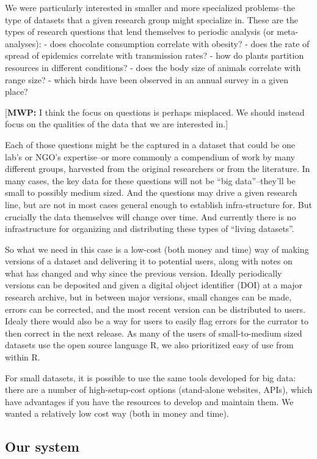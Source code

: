 \documentclass[a4paper,11pt]{article}
\begin{document}
We were particularly interested in smaller and more specialized
problems--the type of datasets that a given research group might
specialize in. These are the types of research questions that lend
themselves to periodic analysis (or meta-analyses): - does chocolate
consumption correlate with obesity? - does the rate of spread of
epidemics correlate with transmission rates? - how do plants partition
resources in different conditions? - does the body size of animals
correlate with range size? - which birds have been observed in an annual
survey in a given place?

{[}\textbf{MWP:} I think the focus on questions is perhaps misplaced. We
should instead focus on the qualities of the data that we are interested
in.{]}

Each of those questions might be the captured in a dataset that could be
one lab's or NGO's expertise--or more commonly a compendium of work by
many different groups, harvested from the original researchers or from
the literature. In many cases, the key data for these questions will not
be ``big data''--they'll be small to possibly medium sized. And the
questions may drive a given research line, but are not in most cases
general enough to establish infra-structure for. But crucially the data
themselves will change over time. And currently there is no
infrastructure for organizing and distributing these types of ``living
datasets''.

So what we need in this case is a low-cost (both money and time) way of
making versions of a dataset and delivering it to potential users, along
with notes on what has changed and why since the previous version.
Ideally periodically versions can be deposited and given a digital
object identifier (DOI) at a major research archive, but in between
major versions, small changes can be made, errors can be corrected, and
the most recent version can be distributed to users. Idealy there would
also be a way for users to easily flag errors for the currator to then
correct in the next release. As many of the users of small-to-medium
sized datasets use the open source language R, we also prioritized easy
of use from within R.

For small datasets, it is possible to use the same tools developed for
big data: there are a number of high-setup-cost options (stand-alone
websites, APIs), which have advantages if you have the resources to
develop and maintain them. We wanted a relatively low cost way (both in
money and time).

\subsection{Our system}
\end{document}
